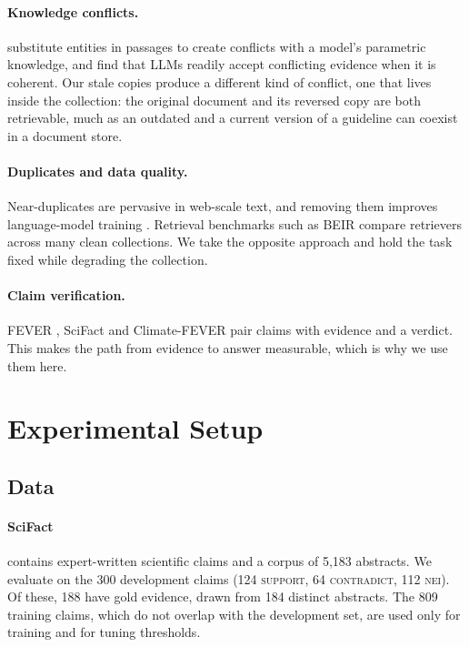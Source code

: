 \documentclass[11pt]{article}
\newcommand{\Sup}{\textsc{support}}
\newcommand{\Con}{\textsc{contradict}}
\newcommand{\Nei}{\textsc{nei}}
\begin{document}
\paragraph{Knowledge conflicts.}
\citet{longpre2021conflicts} substitute entities in passages to create conflicts with a model's parametric
knowledge, and \citet{xie2024chameleon} find that LLMs readily accept conflicting evidence when it is
coherent. Our stale copies produce a different kind of conflict, one that lives inside the collection: the
original document and its reversed copy are both retrievable, much as an outdated and a current version of
a guideline can coexist in a document store.

\paragraph{Duplicates and data quality.}
Near-duplicates are pervasive in web-scale text, and removing them improves language-model training
\citep{lee2022dedup}. Retrieval benchmarks such as BEIR \citep{thakur2021beir} compare retrievers across
many clean collections. We take the opposite approach and hold the task fixed while degrading the
collection.

\paragraph{Claim verification.}
FEVER \citep{thorne2018fever}, SciFact \citep{wadden2020scifact} and Climate-FEVER
\citep{diggelmann2020climatefever} pair claims with evidence and a verdict. This makes the path from
evidence to answer measurable, which is why we use them here.

\section{Experimental Setup}

\subsection{Data}
\paragraph{SciFact} contains expert-written scientific claims and a corpus of 5,183 abstracts. We evaluate
on the 300 development claims (124 \Sup, 64 \Con, 112 \Nei). Of these, 188 have gold evidence, drawn from
184 distinct abstracts. The 809 training claims, which do not overlap with the development set, are used
only for training and for tuning thresholds.
\end{document}
